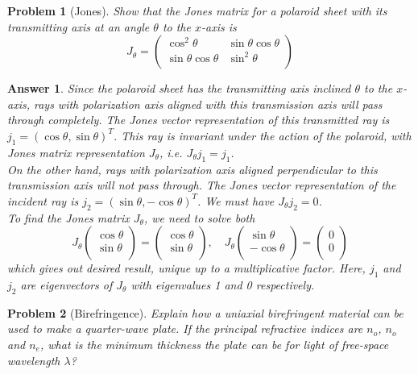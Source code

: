 \documentclass[a4paper]{article}
\newtheorem{ans}{Answer}
\theoremstyle{new}
\newtheorem{qns}{Problem}
\begin{document}
\newpage
\begin{qns}[Jones]
Show that the Jones matrix for a polaroid sheet with its transmitting axis at an angle $\theta$ to the $x$-axis is
$$J_\theta=\begin{pmatrix}\cos^2\theta&\sin\theta\cos\theta\\\sin\theta\cos\theta&\sin^2\theta\\\end{pmatrix}$$
\end{qns}
\begin{ans}
Since the polaroid sheet has the transmitting axis inclined $\theta$ to the $x$-axis, rays with polarization axis aligned with this transmission axis will pass through completely. The Jones vector representation of this transmitted ray is $j_1=(\cos\theta,\sin\theta)^T$. This ray is invariant under the action of the polaroid, with Jones matrix representation $J_\theta$, i.e. $J_\theta j_1=j_1$.\\[5pt]
On the other hand, rays with polarization axis aligned perpendicular to this transmission axis will not pass through. The Jones vector representation of the incident ray is $j_2=(\sin\theta,-\cos\theta)^T$. We must have $J_\theta j_2=0$.\\[5pt]
To find the Jones matrix $J_\theta$, we need to solve both
$$J_\theta\begin{pmatrix}\cos\theta\\\sin\theta\\\end{pmatrix}=\begin{pmatrix}\cos\theta\\\sin\theta\\\end{pmatrix},\quad J_\theta\begin{pmatrix}\sin\theta\\-\cos\theta\\\end{pmatrix}=\begin{pmatrix}0\\0\\\end{pmatrix}$$
which gives out desired result, unique up to a multiplicative factor. Here, $j_1$ and $j_2$ are eigenvectors of $J_\theta$ with eigenvalues 1 and 0 respectively.
\end{ans}
\begin{qns}[Birefringence]
Explain how a uniaxial birefringent material can be used to make a quarter-wave plate. If the principal refractive indices are $n_o$, $n_o$ and $n_e$, what is the minimum thickness the plate can be for light of free-space wavelength $\lambda$?
\end{qns}
\end{document}
